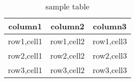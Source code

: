 \documentclass{article}
\begin{document}
	\begin{table}
		\centering
		\begin{tabular}{|c|c|c|}
			\hline
			column1 & column2 & column3\\
			\hline
			row1,cell1 & row1,cell2 & row1,cell3\\
			row2,cell1 & row2,cell2 & row2,cell3\\
			row3,cell1 & row3,cell2 & row3,cell3\\
			\hline
		\end{tabular}
		\caption{sample table}
		\label{fig:tab}
	\end{table}
\end{document}
